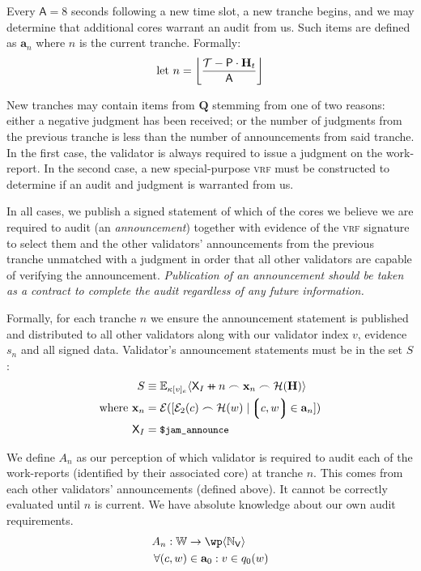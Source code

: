 Every $\mathsf{A} = 8$ seconds following a new time slot, a new tranche begins, and we may determine that additional cores warrant an audit from us. Such items are defined as $\mathbf{a}_n$ where $n$ is the current tranche. Formally:
\begin{equation}
  \using n = \ffrac{\mathcal{T} - \mathsf{P}\cdot\mathbf{H}_t}{\mathsf{A}}
\end{equation}

New tranches may contain items from $\mathbf{Q}$ stemming from one of two reasons: either a negative judgment has been received; or the number of judgments from the previous tranche is less than the number of announcements from said tranche. In the first case, the validator is always required to issue a judgment on the work-report. In the second case, a new special-purpose \textsc{vrf} must be constructed to determine if an audit and judgment is warranted from us.

In all cases, we publish a signed statement of which of the cores we believe we are required to audit (an \emph{announcement}) together with evidence of the \textsc{vrf} signature to select them and the other validators' announcements from the previous tranche unmatched with a judgment in order that all other validators are capable of verifying the announcement. \emph{Publication of an announcement should be taken as a contract to complete the audit regardless of any future information.}

Formally, for each tranche $n$ we ensure the announcement statement is published and distributed to all other validators along with our validator index $v$, evidence $s_n$ and all signed data. Validator's announcement statements must be in the set $S$:
\begin{align}
  S &\equiv \sig{\kappa[v]_e}{\mathsf{X}_I \doubleplus n \concat \mathbf{x}_n \concat \hash(\mathbf{H})} \\
  \where \mathbf{x}_n &= \se([\se_2(c) \frown \hash(w) \mid \tup{c, w} \in \mathbf{a}_n])\\
  \mathsf{X}_I &= \token{\$jam\_announce}
\end{align}

We define $A_n$ as our perception of which validator is required to audit each of the work-reports (identified by their associated core) at tranche $n$. This comes from each other validators' announcements (defined above). It cannot be correctly evaluated until $n$ is current. We have absolute knowledge about our own audit requirements.
\begin{align}
  A_n: \mathbb{W} &\to \powset{\N_\mathsf{V}} \\
  \forall (c, w) &\in \mathbf{a}_0 : v \in q_0(w)
\end{align}

